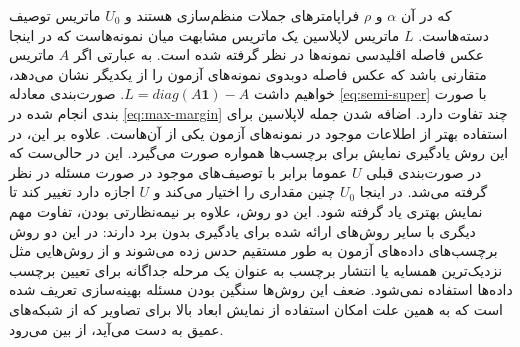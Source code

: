 که در آن $\alpha$ و $\rho$ فراپامترهای جملات منظم‌سازی هستند و $U_0$ ماتریس توصیف دسته‌هاست.  $L$ ماتریس لاپلاسین یک ماتریس مشابهت میان نمونه‌هاست که در اینجا عکس فاصله اقلیدسی نمونه‌ها در نظر گرفته شده است. به عبارتی اگر $A$ ماتریس متقارنی باشد که عکس فاصله دوبدوی نمونه‌های آزمون را از یکدیگر نشان می‌دهد، خواهیم داشت 
$ L = diag(A\mathbf{1}) - A$.
صورت‌بندی معادله \eqref{eq:semi-super} با صورت بندی انجام شده در \eqref{eq:max-margin} چند تفاوت دارد. اضافه شدن جمله لاپلاسین برای استفاده بهتر از اطلاعات موجود در نمونه‌های آزمون یکی از آن‌هاست. علاوه بر این، در این روش یادگیری نمایش برای برچسب‌ها همواره صورت می‌گیرد. این در حالی‌ست که در صورت‌بندی قبلی $U$ عموما برابر با توصیف‌های موجود در صورت مسئله در نظر گرفته می‌شد. در اینجا $U_0$ چنین مقداری را اختیار می‌کند و $U$ اجازه دارد تغییر کند تا نمایش بهتری یاد گرفته شود. این دو روش، علاوه بر نیمه‌نظارتی بودن، تفاوت مهم دیگری با سایر روش‌های ارائه شده برای یادگیری بدون برد دارند: در این دو روش برچسب‌های داده‌های آزمون به طور مستقیم حدس زده می‌شوند و از روش‌هایی مثل نزدیک‌ترین همسایه یا انتشار برچسب به عنوان یک مرحله جداگانه برای تعیین برچسب داده‌ها استفاده نمی‌شود. ضعف این روش‌ها سنگین بودن مسئله بهینه‌سازی تعریف شده است که به همین علت امکان استفاده از نمایش ابعاد بالا برای تصاویر که از شبکه‌های عمیق به دست می‌آید، از بین می‌رود.

